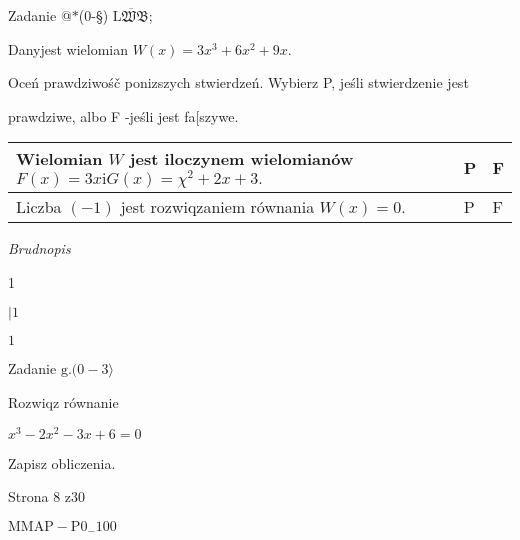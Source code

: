 \documentclass[a4paper,12pt]{article}
\begin{document}
Zadanie @$*$(0-\S) $\overline{\mathrm{L}\mathfrak{W}\mathfrak{B}}$;

Danyjest wielomian $W(x)=3x^{3}+6x^{2}+9x.$

Oceń prawdziwośč ponizszych stwierdzeń. Wybierz P, jeśli stwierdzenie jest

prawdziwe, albo F -jeśli jest fa[szywe.
\begin{center}
\begin{tabular}{|l|l|l|}
\hline
\multicolumn{1}{|l|}{Wielomian $W$ jest iloczynem wielomianów $F(x)=3x \mathrm{i} G(x)=\chi^{2}+2x+3.$}&	\multicolumn{1}{|l|}{P}&	\multicolumn{1}{|l|}{F}	\\
\hline
\multicolumn{1}{|l|}{Liczba $(-1)$ jest rozwiqzaniem równania $W(x)=0.$}&	\multicolumn{1}{|l|}{P}&	\multicolumn{1}{|l|}{F}	\\
\hline
\end{tabular}

\end{center}
{\it Brudnopis}

1

$| 1$

$1$

Zadanie $\mathrm{g}. (0-3\rangle$

Rozwiqz równanie

$x^{3}-2x^{2}-3x+6=0$

Zapisz obliczenia.

Strona 8 z30

$\mathrm{M}\mathrm{M}\mathrm{A}\mathrm{P}-\mathrm{P}0_{-}100$
\end{document}
